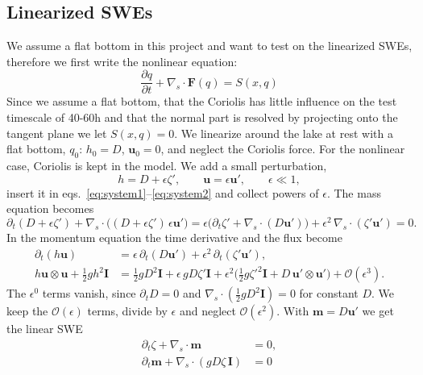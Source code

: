 \subsection{Linearized SWEs}
We assume a flat bottom in this project and want to test on the linearized SWEs, therefore we first write the nonlinear equation:
$$
\frac{\partial q}{\partial t} + \nabla_s \cdot \mathbf{F}(q) = S(x,q)
$$
Since we assume a flat bottom, that the Coriolis has little influence on the test timescale of 40-60h and that the normal part is resolved by projecting onto the tangent plane we let $S(x,q)=0$. We linearize around the lake at rest with a flat bottom, $q_0$: $h_0 = D$, $\mathbf{u}_0 = 0$,
and neglect the Coriolis force. For the nonlinear case, Coriolis is kept in the model. We add a small perturbation,
\begin{equation*}
    h = D + \epsilon\zeta', \qquad \mathbf{u} = \epsilon\mathbf{u}', \qquad \epsilon \ll 1,
\end{equation*}
insert it in eqs.~\eqref{eq:system1}--\eqref{eq:system2} and collect powers of $\epsilon$.
The mass equation becomes
\begin{equation}\label{eq:LinearMass}
    \partial_t(D + \epsilon\zeta') + \nabla_s\cdot\big((D + \epsilon\zeta')\,\epsilon\mathbf{u}'\big)
    = \epsilon\big(\partial_t\zeta' + \nabla_s\cdot(D\mathbf{u}')\big) + \epsilon^2\,\nabla_s\cdot(\zeta'\mathbf{u}') = 0 .
\end{equation}
In the momentum equation the time derivative and the flux become
\begin{align}
    \partial_t(h\mathbf{u}) &= \epsilon\,\partial_t(D\mathbf{u}') + \epsilon^2\,\partial_t(\zeta'\mathbf{u}'), \label{eq:LinearMomentumTime}\\
    h\mathbf{u}\otimes\mathbf{u} + \tfrac12 gh^2\mathbf{I}
    &= \tfrac12 gD^2\mathbf{I} + \epsilon\, gD\zeta'\mathbf{I}
    + \epsilon^2\big(\tfrac12 g\zeta'^2\mathbf{I} + D\,\mathbf{u}'\otimes\mathbf{u}'\big) + \mathcal{O}(\epsilon^3). \label{eq:LinearMomentumFlux}
\end{align}
The $\epsilon^0$ terms vanish, since $\partial_t D = 0$ and $\nabla_s\cdot(\tfrac12 gD^2\mathbf{I}) = 0$ for constant $D$. We keep the $\mathcal{O}(\epsilon)$ terms, divide by $\epsilon$ and neglect $\mathcal{O}(\epsilon^2)$.
With $\mathbf{m} = D\mathbf{u}'$ we get the linear SWE
\begin{align}
    \partial_t\zeta + \nabla_s\cdot\mathbf{m} &= 0 \label{eq:LinearSys1},\\
    \partial_t\mathbf{m} + \nabla_s\cdot(gD\zeta\,\mathbf{I}) &= 0 \label{eq:LinearSys2}
\end{align}

